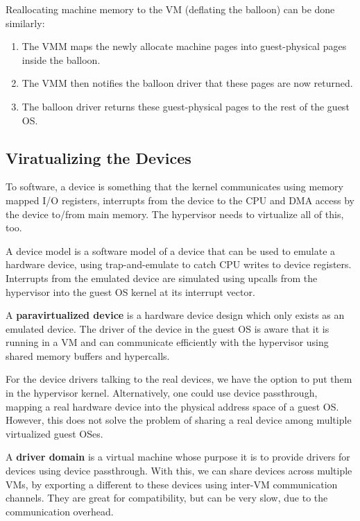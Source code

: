 Reallocating machine memory to the VM (deflating the balloon) can be done similarly:
\begin{enumerate}
	\item The VMM maps the newly allocate machine pages into guest-physical pages inside the balloon.
	\item The VMM then notifies the balloon driver that these pages are now returned.
	\item The balloon driver returns these guest-physical pages to the rest of the guest OS.
\end{enumerate}


\subsection{Viratualizing the Devices}

To software, a device is something that the kernel communicates using memory mapped I/O registers, interrupts from the device to the CPU and DMA access by the device to/from main memory. The hypervisor needs to virtualize all of this, too.\medskip

A device model is a software model of a device that can be used to emulate a hardware device, using trap-and-emulate to catch CPU writes to device registers. Interrupts from the emulated device are simulated using upcalls from the hypervisor into the guest OS kernel at its interrupt vector.\medskip

A \textbf{paravirtualized device} is a hardware device design which only exists as an emulated device. The driver of the device in the guest OS is aware that it is running in a VM and can communicate efficiently with the hypervisor using shared memory buffers and hypercalls.\medskip

For the device drivers talking to the real devices, we have the option to put them in the hypervisor kernel. Alternatively, one could use device passthrough, mapping a real hardware device into the physical address space of a guest OS. However, this does not solve the problem of sharing a real device among multiple virtualized guest OSes.\medskip

A \textbf{driver domain} is a virtual machine whose purpose it is to provide drivers for devices using device passthrough. With this, we can share devices across multiple VMs, by exporting a different to these devices using inter-VM communication channels. They are great for compatibility, but can be very slow, due to the communication overhead.\medskip

